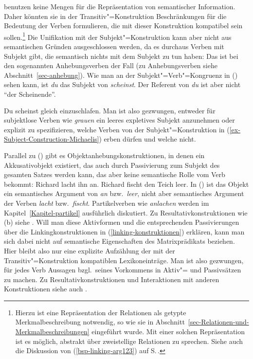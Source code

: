 \citet{MR2001a} benutzen keine Mengen für die Repräsentation von semantischer Information.
Daher könnten sie in der Transitiv"=Konstruktion Beschränkungen für die Bedeutung der Verben
formulieren, die mit dieser Konstruktion kompatibel sein sollen.\footnote{
  Hierzu ist eine Repräsentation der Relationen als getypte Merkmalbeschreibung notwendig, so
  wie sie in Abschnitt~\ref{sec-Relationen-und-Merkmalbeschreibungen} eingeführt wurde. Mit einer solchen
  Repräsentation ist es möglich, abstrakt über zweistellige Relationen zu sprechen. 
  Siehe \zb auch die Diskussion von (\ref{bsp-linking-arg123}) auf
  S.\,\pageref{bsp-linking-arg123}.%
}
Die Unifikation mit der Subjekt"=Konstruktion kann aber nicht aus semantischen Gründen ausgeschlossen
werden, da es durchaus Verben mit Subjekt gibt, die semantisch nichts mit dem Subjekt zu tun haben:
Das ist bei den sogenannten Anhebungsverben der Fall (zu Anhebungsverben
siehe Abschnitt~\ref{sec-anhebung}). Wie man an der Subjekt"=Verb"=Kongruenz in ()
sehen kann, ist \emph{du} das Subjekt von \emph{scheinst}. Der Referent von \emph{du} ist aber nicht
"`der Scheinende"'.

\ea
Du scheinst gleich einzuschlafen.
\z
Man ist also gezwungen, entweder für subjektlose Verben wie \emph{grauen} ein leeres expletives
Subjekt anzunehmen oder explizit zu spezifizieren, welche Verben von der Subjekt"=Konstruktion in (\ref{ex-Subject-Construction-Michaelis})
erben dürfen und welche nicht.


Parallel zu () gibt es Objektanhebungskonstruktionen, in denen ein Akkusativobjekt
existiert, das auch durch Passivierung zum Subjekt des gesamten Satzes werden kann, das
aber keine semantische Rolle vom Verb bekommt:
\eal
\ex Richard lacht ihn an.
\ex Richard fischt den Teich leer.
\zl
In () ist das Objekt ein semantisches Argument von \emph{an} bzw.\ \emph{leer}, nicht aber
semantisches Argument der Verben \emph{lacht} bzw.\ \emph{fischt}.
Partikelverben wie \emph{anlachen} werden im Kapitel~\ref{Kapitel-partikel} ausführlich diskutiert.
Zu Resultativkonstruktionen wie (b) siehe .
Will man diese Aktivformen und die entsprechenden Passivierungen über die Linkingkonstruktionen
in (\ref{linking-konstruktionen}) erklären, kann man sich dabei nicht auf semantische Eigenschaften
des Matrixprädikats beziehen. Hier bleibt also nur eine explizite Aufzählung der mit
der Transitiv"=Konstruktion kompatiblen Lexikoneinträge. Man ist also gezwungen, für jedes Verb
Aussagen bzgl.\ seines Vorkommens in Aktiv"= und Passivsätzen zu machen.
Zu Resultativkonstruktionen und
Interaktionen mit anderen Konstruktionen siehe auch .
\largerpage[2]


